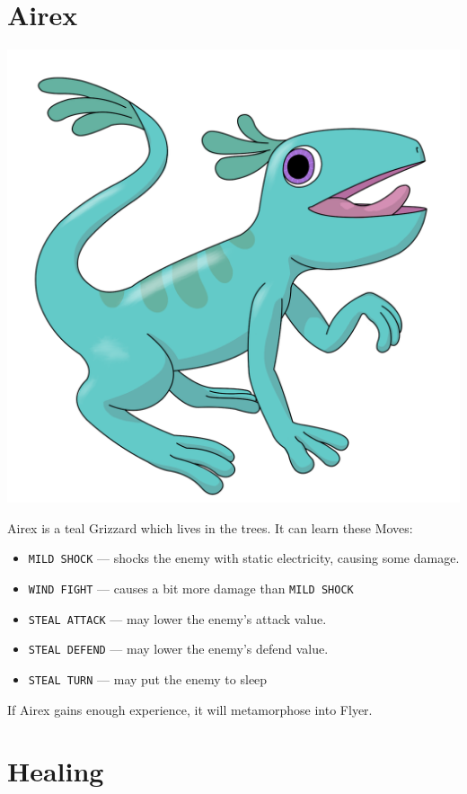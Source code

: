 \documentclass[10pt,twocolumn,openany,article]{memoir}
\begin{document}
\begin{description}
\ifdefined\DEMO\else

\section{Airex}

\includegraphics[width=\columnwidth]{../Manual/Airex.png}

Airex is a teal Grizzard which lives in the trees. It can learn these Moves:

\begin{itemize}
\item \texttt{MILD SHOCK} --- shocks  the enemy with static electricity,
  causing some damage.
\item \texttt{WIND FIGHT} --- causes a bit more damage than \texttt{MILD SHOCK}
\item \texttt{STEAL ATTACK} --- may lower the enemy's attack value.
\item \texttt{STEAL DEFEND} --- may lower the enemy's defend value.
\item \texttt{STEAL TURN} --- may put the enemy to sleep
\end{itemize}

If Airex gains enough experience, it will metamorphose into Flyer.

\fi

\section{Healing}


\end{description}
\end{document}
